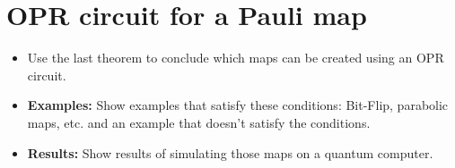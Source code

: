 \section{OPR circuit for a Pauli map}
\begin{itemize}
\item Use the last theorem to conclude which maps can be created using an OPR circuit.
\item \textbf{Examples:} Show examples that satisfy these conditions: Bit-Flip, parabolic maps, etc. and an example that doesn't satisfy the conditions.
\item \textbf{Results:} Show results of simulating those maps on a quantum computer. 
\end{itemize}